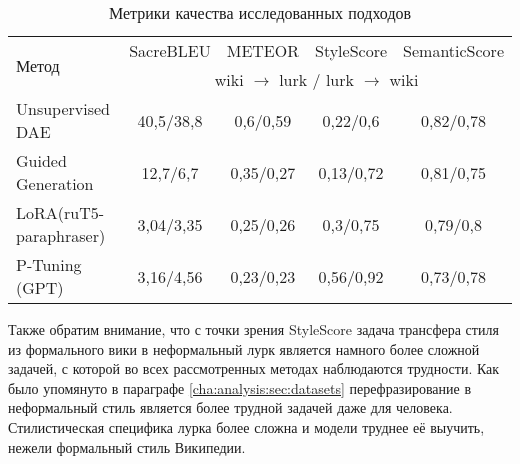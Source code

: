 \begin{table}[ht]
\small
\centering
\caption{Метрики качества исследованных подходов}
\label{table:results}
\begin{tabular}{|p{}|c|c|c|c|}
\hline
\multirow{2}{*}{Метод} & SacreBLEU & METEOR & StyleScore & SemanticScore   \\ \cline{2-5}
 & \multicolumn{4}{c|}{wiki $\rightarrow$ lurk / lurk $\rightarrow$ wiki} \\ \hline \hline
Unsupervised DAE & 40,5/38,8 & 0,6/0,59 & 0,22/0,6 & 0,82/0,78 \\\hline
Guided Generation & 12,7/6,7 & 0,35/0,27 & 0,13/0,72 & 0,81/0,75 \\\hline
LoRA(ruT5-paraphraser) & 3,04/3,35 & 0,25/0,26 & 0,3/0,75 & 0,79/0,8 \\\hline
P-Tuning (GPT) & 3,16/4,56 & 0,23/0,23 & 0,56/0,92 & 0,73/0,78 \\\hline
\end{tabular}
\end{table}

Также обратим внимание, что с точки зрения StyleScore задача трансфера стиля из формального вики в неформальный лурк является намного более сложной задачей, с которой во всех рассмотренных методах наблюдаются трудности.
Как было упомянуто в параграфе \ref{cha:analysis:sec:datasets} перефразирование в неформальный стиль является более трудной задачей даже для человека.
Стилистическая специфика лурка более сложна и модели труднее её выучить, нежели формальный стиль Википедии.


